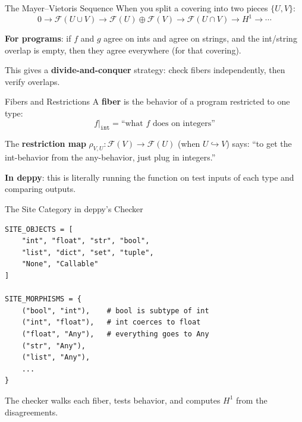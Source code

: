 \documentclass[aspectratio=169,11pt]{beamer}
\begin{document}
\begin{frame}{The Mayer--Vietoris Sequence}
When you split a covering into two pieces $\{U, V\}$:
\[
0 \to \mathcal{F}(U \cup V) \to \mathcal{F}(U) \oplus \mathcal{F}(V) \to \mathcal{F}(U \cap V) \to H^1 \to \cdots
\]

\vspace{0.5em}
\textbf{For programs}: if $f$ and $g$ agree on ints and agree on strings, and the int/string overlap is empty, then they agree everywhere (for that covering).

\vspace{0.5em}
This gives a \textbf{divide-and-conquer} strategy: check fibers independently, then verify overlaps.
\end{frame}

\begin{frame}{Fibers and Restrictions}
A \textbf{fiber} is the behavior of a program restricted to one type:
\[
f|_{\texttt{int}} = \text{``what $f$ does on integers''}
\]

\vspace{0.5em}
The \textbf{restriction map} $\rho_{V,U} : \mathcal{F}(V) \to \mathcal{F}(U)$ (when $U \hookrightarrow V$) says: ``to get the int-behavior from the any-behavior, just plug in integers.''

\vspace{0.5em}
\textbf{In deppy}: this is literally running the function on test inputs of each type and comparing outputs.
\end{frame}

\begin{frame}{The Site Category in deppy's Checker}
\begin{lstlisting}[language=deppy, basicstyle=\tiny\ttfamily]
SITE_OBJECTS = [
    "int", "float", "str", "bool",
    "list", "dict", "set", "tuple",
    "None", "Callable"
]

SITE_MORPHISMS = {
    ("bool", "int"),    # bool is subtype of int
    ("int", "float"),   # int coerces to float
    ("float", "Any"),   # everything goes to Any
    ("str", "Any"),
    ("list", "Any"),
    ...
}
\end{lstlisting}

\vspace{0.3em}
The checker walks each fiber, tests behavior, and computes $H^1$ from the disagreements.
\end{frame}
\end{document}
